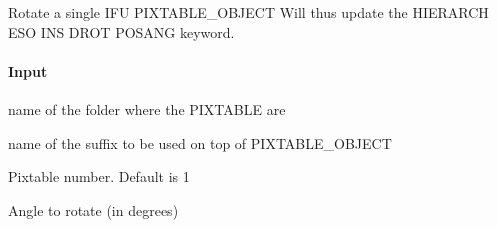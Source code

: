 \documentclass[letterpaper,10pt,english]{sphinxmanual}
\begin{document}
\begin{fulllineitems}
\label{\detokenize{api/pymusepipe:pymusepipe.align_pipe.rotate_pixtable}}
\pysigstartsignatures
{}
\pysigstopsignatures
\sphinxAtStartPar
Rotate a single IFU PIXTABLE\_OBJECT
Will thus update the HIERARCH ESO INS DROT POSANG keyword.


\paragraph{Input}
\label{\detokenize{api/pymusepipe:id37}}\begin{description}
\sphinxAtStartPar
name of the folder where the PIXTABLE are

\sphinxAtStartPar
name of the suffix to be used on top of PIXTABLE\_OBJECT

\sphinxAtStartPar
Pixtable number. Default is 1

\sphinxAtStartPar
Angle to rotate (in degrees)

\end{description}

\end{fulllineitems}

\end{document}
